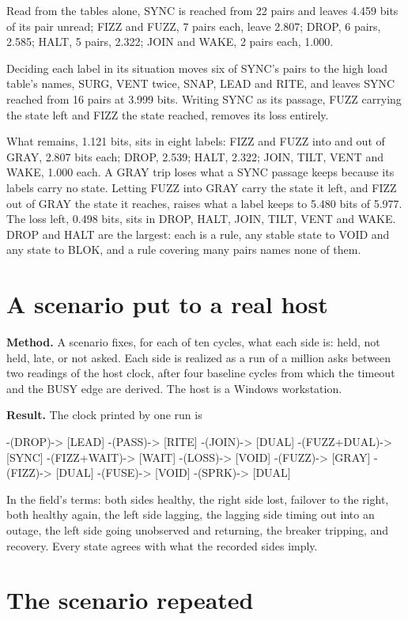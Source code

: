 Read from the tables alone, SYNC is reached from 22 pairs and leaves 4.459 bits of its pair
unread; FIZZ and FUZZ, 7 pairs each, leave 2.807; DROP, 6 pairs, 2.585; HALT, 5 pairs, 2.322; JOIN
and WAKE, 2 pairs each, 1.000.

Deciding each label in its situation moves six of SYNC's pairs to the high load table's names,
SURG, VENT twice, SNAP, LEAD and RITE, and leaves SYNC reached from 16 pairs at 3.999 bits.
Writing SYNC as its passage, FUZZ carrying the state left and FIZZ the state reached, removes its
loss entirely.

What remains, 1.121 bits, sits in eight labels: FIZZ and FUZZ into and out of GRAY, 2.807 bits
each; DROP, 2.539; HALT, 2.322; JOIN, TILT, VENT and WAKE, 1.000 each. A GRAY trip loses what a
SYNC passage keeps because its labels carry no state. Letting FUZZ into GRAY carry the state it
left, and FIZZ out of GRAY the state it reaches, raises what a label keeps to 5.480 bits of
5.977. The loss left, 0.498 bits, sits in DROP, HALT, JOIN, TILT, VENT and WAKE. DROP and HALT
are the largest: each is a rule, any stable state to VOID and any state to BLOK, and a rule
covering many pairs names none of them.

\section{A scenario put to a real host}
\label{sec:scenario}

\textbf{Method.} A scenario fixes, for each of ten cycles, what each side is: held, not held,
late, or not asked. Each side is realized as a run of a million asks between two readings of the
host clock, after four baseline cycles from which the timeout and the BUSY edge are derived. The
host is a Windows workstation.

\textbf{Result.} The clock printed by one run is
\begin{flushleft}\small\ttfamily
[DUAL] -(DROP)-> [LEAD] -(PASS)-> [RITE] -(JOIN)-> [DUAL] -(FUZZ+DUAL)-> [SYNC] -(FIZZ+WAIT)->
[WAIT] -(LOSS)-> [VOID] -(FUZZ)-> [GRAY] -(FIZZ)-> [DUAL] -(FUSE)-> [VOID] -(SPRK)-> [DUAL]
\end{flushleft}
In the field's terms: both sides healthy, the right side lost, failover to the right, both healthy
again, the left side lagging, the lagging side timing out into an outage, the left side going
unobserved and returning, the breaker tripping, and recovery. Every state agrees with what the
recorded sides imply.

\section{The scenario repeated}
\label{sec:repeat}

